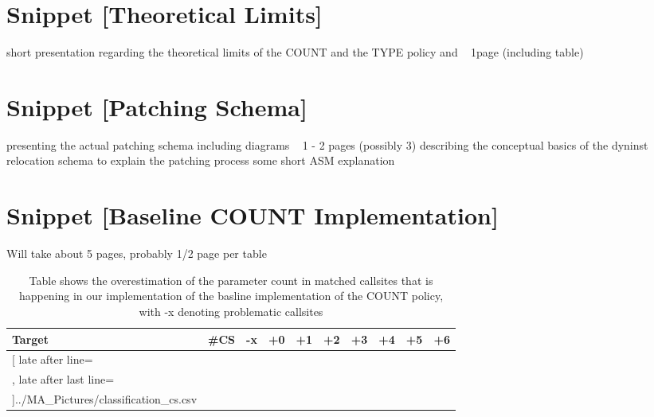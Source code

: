 \chapter{Snippet [Theoretical Limits]}
short presentation regarding the theoretical limits of the COUNT and the TYPE policy and ~ 1page (including table)



\chapter{Snippet [Patching Schema]}
presenting the actual patching schema including diagrams ~ 1 - 2 pages (possibly 3)
describing the conceptual basics of the dyninst relocation schema to explain the patching process
some short ASM explanation


\chapter{Snippet [Baseline COUNT Implementation]}

Will take about 5 pages, probably 1/2 page per table

\begin{wraptable}{r}{0pt}
	\begin{tabular}{l|c|c|c|c|c|c|c|c|c}%
	\toprule
	\bfseries Target & \bfseries \#CS & \bfseries -x & \bfseries +0 & \bfseries +1 & \bfseries +2 & \bfseries +3 & \bfseries +4 & \bfseries +5 & \bfseries +6 %
	\\\midrule
	\csvreader[ late after line=\\, late after last line=\\\bottomrule]{../MA_Pictures/classification_cs.csv}{
	}
	{\csvcoli & \csvcoliii & \csvcoliv & \csvcolv & \csvcolvi & \csvcolvii & \csvcolviii & \csvcolix & \csvcolx & \csvcolxi}%
    	\end{tabular}
		\caption {Table shows the overestimation of the parameter count in matched callsites that is happening in our implementation of the basline implementation of the COUNT policy, with -x denoting problematic callsites}
	\label{tbl:baselinecs}
\end{wraptable}

